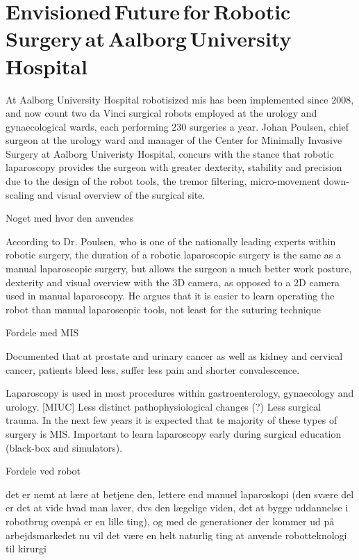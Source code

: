 \section{Envisioned\,Future\,for\,Robotic\,Surgery\,at\,Aalborg\,University\,Hospital}

At Aalborg University Hospital robotisized \gls{mis} has been implemented since 2008, and now count two da Vinci surgical robots employed at the urology and gynaecological wards, each performing 230 surgeries a year. %
Johan Poulsen, chief surgeon at the urology ward and manager of the Center for Minimally Invasive Surgery at Aalborg Univeristy Hospital, concurs with the stance that robotic laparoscopy provides the surgeon with greater dexterity, stability and precision due to the design of the robot tools, the tremor filtering, micro-movement down-scaling %
and visual overview of the surgical site. 

Noget med hvor den anvendes

According to Dr. Poulsen, who is one of the nationally leading experts within robotic surgery, the duration of a robotic laparoscopic surgery is the same as a manual laparoscopic surgery, but allows the surgeon a much better work posture, dexterity and visual overview with the 3D camera, as opposed to a 2D camera used in manual laparoscopy.
He argues that it is easier to learn operating the robot than manual laparoscopic tools, not least for the suturing technique









Fordele med MIS 

Documented that at prostate and urinary cancer as well as kidney and cervical cancer, patients bleed less, suffer less pain and shorter convalescence.

Laparoscopy is used in most procedures within gastroenterology, gynaecology and urology. [MIUC] Less distinct pathophysiological changes (?) Less surgical trauma.
In the next few years it is expected that te majority of these types of surgery is MIS. Important to learn laparoscopy early during surgical education (black-box and simulators).


Fordele ved robot




det er nemt at lære at betjene den, lettere end manuel laparoskopi (den svære del er det at vide hvad man laver, dvs den lægelige viden, det at bygge uddannelse i robotbrug ovenpå er en lille ting), og med de generationer der kommer ud på arbejdsmarkedet nu vil det være en helt naturlig ting at anvende robotteknologi til kirurgi



